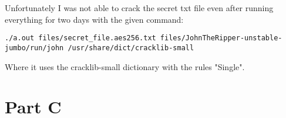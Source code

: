 \documentclass[12pt]{article}
\begin{document}
Unfortunately I was not able to crack the secret txt file even after running everything for two days with the given command:
\begin{lstlisting}
./a.out files/secret_file.aes256.txt files/JohnTheRipper-unstable-jumbo/run/john /usr/share/dict/cracklib-small
\end{lstlisting}
Where it uses the cracklib-small dictionary with the rules "Single".

\part*{Part C}
\end{document}
